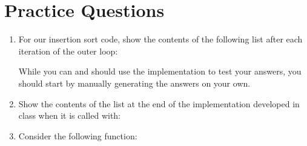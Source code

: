\documentclass[letterpaper,10pt,english]{sphinxmanual}
\begin{document}
\section{Practice Questions}
\label{\detokenize{lecture_notes/lec21_sorting:practice-questions}}\begin{enumerate}
\def\theenumi{\arabic{enumi}}
\def\labelenumi{\theenumi .}
\makeatletter\def\p@enumii{\p@enumi \theenumi .}\makeatother
\item {} 
For our insertion sort code, show the contents of the following list
after each iteration of the outer  loop:

\begin{sphinxVerbatim}[commandchars=\\\{\}]
  \PYG{p}{[}      \PYG{p}{]}
\end{sphinxVerbatim}

While you can and should use the implementation to test your answers,
you should start by manually generating the answers on your own.

\item {} 
Show the contents of the  list at the end of the
 implementation developed in class when it is called
with:

\begin{sphinxVerbatim}[commandchars=\\\{\}]
  \PYG{p}{[}       \PYG{p}{]}
\end{sphinxVerbatim}

\item {} 
Consider the following function:

\begin{sphinxVerbatim}[commandchars=\\\{\}]
  
      \PYG{p}{[}\PYG{p}{]}
        
         \PYG{p}{[}\PYG{p}{]} 
              \PYG{p}{[}\PYG{p}{]}
     
\end{sphinxVerbatim}


\end{enumerate}
\end{document}
